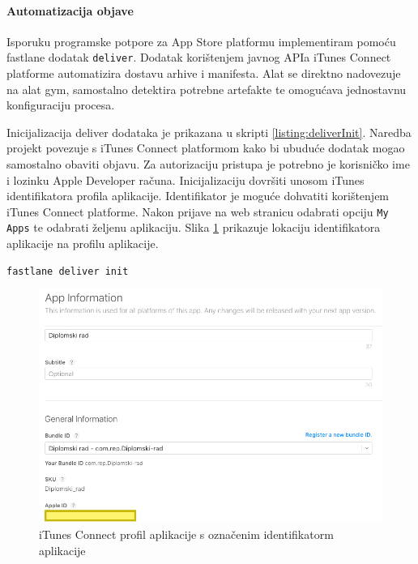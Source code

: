 \documentclass[times, utf8, diplomski, numeric]{fer}
\begin{document}
\paragraph{Automatizacija objave}

Isporuku programske potpore za App Store platformu implementiram pomoću fastlane dodatak \verb|deliver|\citep{fastlane:deliver}. Dodatak korištenjem javnog APIa iTunes Connect platforme automatizira dostavu arhive i manifesta. Alat se direktno nadovezuje na alat gym, samostalno detektira potrebne artefakte te omogućava jednostavnu konfiguraciju procesa.

Inicijalizacija deliver dodataka je prikazana u skripti \ref{listing:deliverInit}. Naredba projekt povezuje s iTunes Connect platformom kako bi ubuduće dodatak mogao samostalno obaviti objavu. Za autorizaciju pristupa je potrebno je korisničko ime i lozinku Apple Developer računa. Inicijalizaciju dovršiti unosom iTunes identifikatora profila aplikacije. Identifikator je moguće dohvatiti korištenjem iTunes Connect platforme. Nakon prijave na web stranicu  odabrati opciju \verb|My Apps| te odabrati željenu aplikaciju. Slika \ref{fig:iTunesConnectAppId} prikazuje lokaciju identifikatora aplikacije na profilu aplikacije.

\begin{lstlisting}[caption=Inicijalizacija deliver dodatka, label=listing:deliverInit]
fastlane deliver init
\end{lstlisting}

\begin{figure}
\centering
\includegraphics[scale=0.4]{iTunesConnectAppId}
\caption{iTunes Connect profil aplikacije s označenim identifikatorm aplikacije}
\label{fig:iTunesConnectAppId}
\end{figure}
\end{document}
